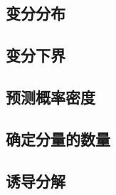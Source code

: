 \subsection*{变分分布}
\subsection*{变分下界}
\subsection*{预测概率密度}
\subsection*{确定分量的数量}
\subsection*{诱导分解}
